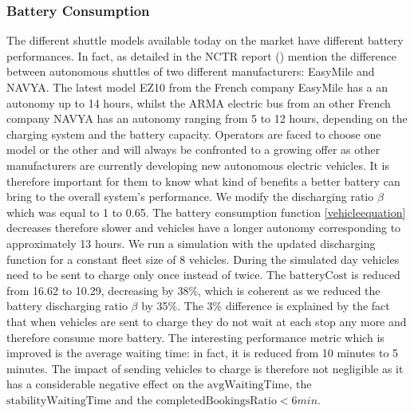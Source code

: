 \documentclass[12pt,a4paper]{article}
\begin{document}
\subsubsection{Battery Consumption}\label{batterycons}
The different shuttle models available today on the market have different battery performances. In fact, as detailed in the NCTR report (\cite{nctr}) mention the difference between autonomous shuttles of two different manufacturers: EasyMile and NAVYA. The latest model EZ10 from the French company EasyMile has a an autonomy up to 14 hours, whilst the ARMA electric bus from an other French company NAVYA has an autonomy ranging from 5 to 12 hours, depending on the charging system and the battery capacity. Operators are faced to choose one model or the other and will always be confronted to a growing offer as other manufacturers are currently developing new autonomous electric vehicles. It is therefore important for them to know what kind of benefits a better battery can bring to the overall system's performance. We modify the discharging ratio $\beta$ which was equal to 1 to 0.65. The battery consumption function \ref{vehicleequation} decreases therefore slower and vehicles have a longer autonomy corresponding to approximately 13 hours. We run a simulation with the updated discharging function for a constant fleet size of 8 vehicles. During the simulated day vehicles need to be sent to charge only once instead of twice. The $\text{batteryCost}$ is reduced from 16.62 to 10.29, decreasing by 38\%, which is coherent as we reduced the battery discharging ratio $\beta$ by 35\%. The 3\% difference is explained by the fact that when vehicles are sent to charge they do not wait at each stop any more and therefore consume more battery. The interesting performance metric which is improved is the average waiting time: in fact, it is reduced from 10 minutes to 5 minutes. The impact of sending vehicles to charge is therefore not negligible as it has a considerable negative effect on the $\text{avgWaitingTime}$, the $\text{stabilityWaitingTime}$ and the $\text{completedBookingsRatio} < 6min$. 
\end{document}

